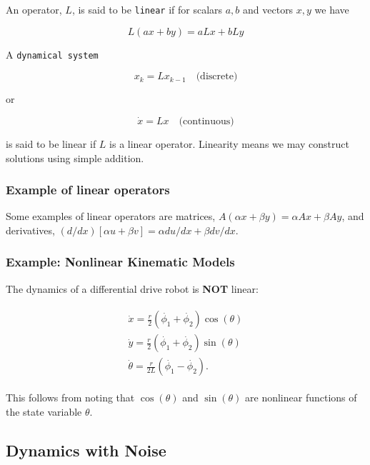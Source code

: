 An operator, \(L\), is said to be \texttt{linear} if for scalars \(a,b\)
and vectors \(x,y\) we have

\[L(ax+by) = aLx + bLy\]

A \texttt{dynamical\ system}

\[x_k = Lx_{k-1} \quad \text{(discrete)}\]

or

\[\dot{x} = Lx \quad \text{(continuous)}\]

is said to be linear if \(L\) is a linear operator. Linearity means we
may construct solutions using simple addition.

\hypertarget{example-of-linear-operators}{%
\subsubsection{Example of linear
operators}\label{example-of-linear-operators}}

Some examples of linear operators are matrices,
\(A(\alpha x + \beta y) = \alpha Ax + \beta Ay\), and derivatives,
\((d/dx) [\alpha u+\beta v] = \alpha du/dx + \beta dv/dx\).

\hypertarget{example-nonlinear-kinematic-models}{%
\subsubsection{Example: Nonlinear Kinematic
Models}\label{example-nonlinear-kinematic-models}}

The dynamics of a differential drive robot is \textbf{NOT} linear:

\[\begin{aligned}
\begin{array}{l}
 \dot{x} = \frac{r}{2} (\dot{\phi_1}+\dot{\phi_2})\cos(\theta) \\[5mm]
\dot{y} = \frac{r}{2} (\dot{\phi_1}+\dot{\phi_2})\sin(\theta) \\[5mm]
\dot{\theta} = \frac{r}{2L} (\dot{\phi_1}-\dot{\phi_2}).
\end{array}
\end{aligned}\]

This follows from noting that \(\cos(\theta)\) and \(\sin(\theta)\) are
nonlinear functions of the state variable \(\theta\).

\hypertarget{dynamics-with-noise}{%
\subsection{Dynamics with Noise}\label{dynamics-with-noise}}

